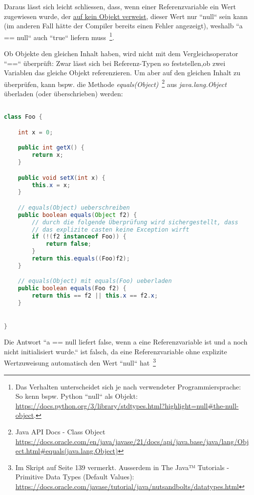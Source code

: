 Daraus lässt sich leicht schliessen, dass, wenn einer Referenzvariable ein Wert zugewiesen wurde, der \underline{auf kein Objekt verweist},
dieser Wert nur ``null`` sein kann (im anderen Fall hätte der Compiler bereits einen Fehler angezeigt), weshalb ``a == null`` auch
``true`` liefern muss~\footnote{
Das Verhalten unterscheidet sich je nach verwendeter Programmiersprache: So kenn bspw. Python ``null`` als Objekt: \url{https://docs.python.org/3/library/stdtypes.html?highlight=null#the-null-object}.
}.

Ob Objekte den gleichen Inhalt haben, wird nicht mit dem Vergleichsoperator ``==`` überprüft: Zwar lässt sich bei Referenz-Typen
so feststellen,ob zwei Variablen das gleiche Objekt referenzieren. Um aber auf den gleichen Inhalt zu überprüfen, kann
bspw. die Methode \textit{equals(Object)}~\footnote{
    Java API Docs - Class Object \url{https://docs.oracle.com/en/java/javase/21/docs/api/java.base/java/lang/Object.html#equals(java.lang.Object)}
} aus \textit{java.lang.Object} überladen (oder überschrieben) werden:


\begin{lstlisting}[language=java]

class Foo {

    int x = 0;

    public int getX() {
        return x;
    }

    public void setX(int x) {
        this.x = x;
    }

    // equals(Object) ueberschreiben
    public boolean equals(Object f2) {
        // durch die folgende Überprüfung wird sichergestellt, dass
        // das explizite casten keine Exception wirft
        if (!(f2 instanceof Foo)) {
            return false;
        }
        return this.equals((Foo)f2);
    }

    // equals(Object) mit equals(Foo) ueberladen
    public boolean equals(Foo f2) {
        return this == f2 || this.x == f2.x;
    }


}
\end{lstlisting}

Die Antwort ``a == null liefert false, wenn a eine Referenzvariable ist und a noch nicht initialisiert wurde.`` ist falsch,
da eine Referenzvariable ohne explizite Wertzuweisung automatisch den Wert ``null`` hat~\footnote{Im Skript auf Seite 139 vermerkt. Ausserdem in The Java™ Tutorials - Primitive Data Types (Default Values): \url{https://docs.oracle.com/javase/tutorial/java/nutsandbolts/datatypes.html}}